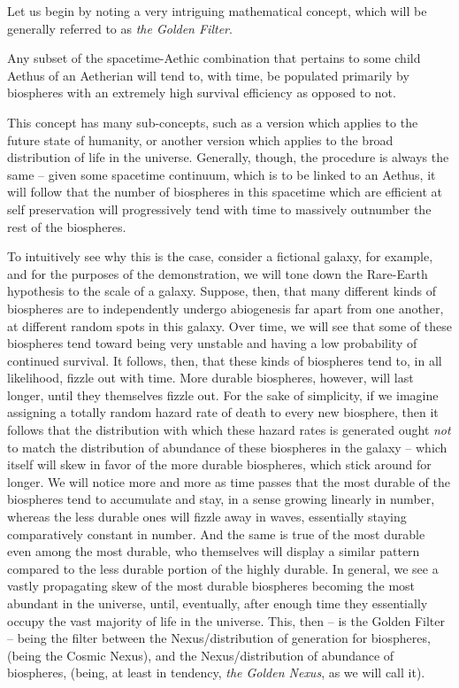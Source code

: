 Let us begin by noting a very intriguing mathematical concept, which will be generally referred to as \textit{the Golden Filter}. 
\begin{prince}
    Any subset of the spacetime-Aethic combination that pertains to some child Aethus of an Aetherian will tend to, with time, be populated primarily by biospheres with an extremely high survival efficiency as opposed to not. 
\end{prince}
This concept has many sub-concepts, such as a version which applies to the future state of humanity, or another version which applies to the broad distribution of life in the universe. Generally, though, the procedure is always the same -- given some spacetime continuum, which is to be linked to an Aethus, it will follow that the number of biospheres in this spacetime which are efficient at self preservation will progressively tend with time to massively outnumber the rest of the biospheres. 

To intuitively see why this is the case, consider a fictional galaxy, for example, and for the purposes of the demonstration, we will tone down the Rare-Earth hypothesis to the scale of a galaxy. Suppose, then, that many different kinds of biospheres are to independently undergo abiogenesis far apart from one another, at different random spots in this galaxy. Over time, we will see that some of these biospheres tend toward being very unstable and having a low probability of continued survival. It follows, then, that these kinds of biospheres tend to, in all likelihood, fizzle out with time. More durable biospheres, however, will last longer, until they themselves fizzle out. For the sake of simplicity, if we imagine assigning a totally random hazard rate of death to every new biosphere, then it follows that the distribution with which these hazard rates is generated ought \textit{not} to match the distribution of abundance of these biospheres in the galaxy -- which itself will skew in favor of the more durable biospheres, which stick around for longer. We will notice more and more as time passes that the most durable of the biospheres tend to accumulate and stay, in a sense growing linearly in number, whereas the less durable ones will fizzle away in waves, essentially staying comparatively constant in number. And the same is true of the most durable even among the most durable, who themselves will display a similar pattern compared to the less durable portion of the highly durable. In general, we see a vastly propagating skew of the most durable biospheres becoming the most abundant in the universe, until, eventually, after enough time they essentially occupy the vast majority of life in the universe. This, then -- is the Golden Filter -- being the filter between the Nexus/distribution of generation for biospheres, (being the Cosmic Nexus), and the Nexus/distribution of abundance of biospheres, (being, at least in tendency, \textit{the Golden Nexus}, as we will call it). 

